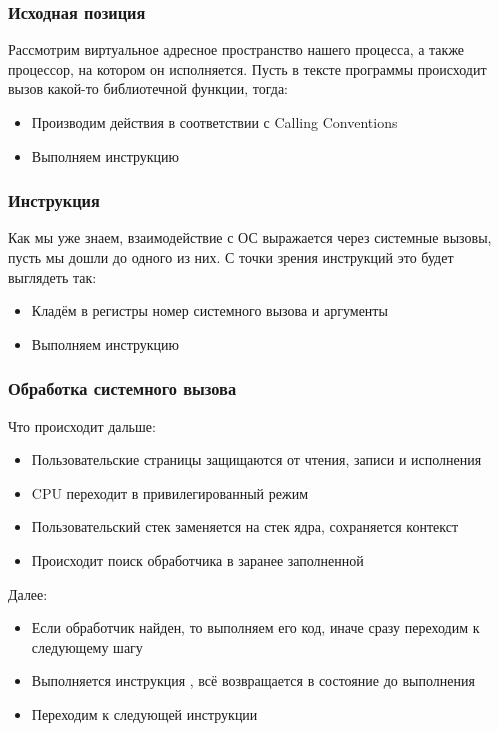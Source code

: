     \subsubsection{Исходная позиция}
      Рассмотрим виртуальное адресное пространство нашего процесса, а также процессор, на котором он исполняется. Пусть в тексте программы происходит вызов какой-то библиотечной функции, тогда:

    \begin{itemize}
      \item Производим действия в соответствии с Calling Conventions
      \item Выполняем инструкцию 
    \end{itemize}

    \subsubsection{Инструкция }
      Как мы уже знаем, взаимодействие с ОС выражается через системные вызовы, пусть мы дошли до одного из них. С точки зрения инструкций это будет выглядеть так:
    \begin{itemize}
      \item Кладём в регистры номер системного вызова и аргументы
      \item Выполняем инструкцию 
    \end{itemize}

  \subsubsection{Обработка системного вызова}
      Что происходит дальше:

    \begin{itemize}
      \item Пользовательские страницы защищаются от чтения, записи и исполнения
      \item CPU переходит в привилегированный режим
      \item Пользовательский стек заменяется на стек ядра, сохраняется контекст
      \item Происходит поиск обработчика в заранее заполненной 
    \end{itemize}
    
    Далее:

    \begin{itemize}
      \item Если обработчик найден, то выполняем его код, иначе сразу переходим к следующему шагу
      \item Выполняется инструкция , всё возвращается в состояние до выполнения 
      \item Переходим к следующей инструкции
    \end{itemize}
      
